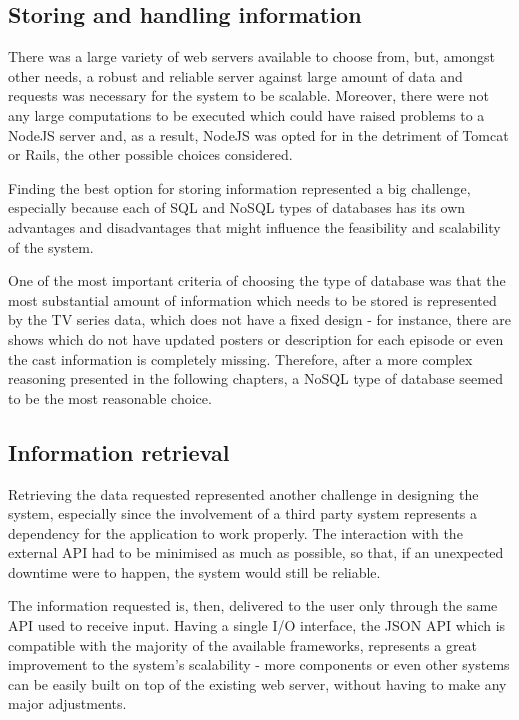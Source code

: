 \subsection{Storing and handling information}

There was a large variety of web servers available to choose from, but, amongst other needs, a robust and reliable server against large amount of data and requests was necessary for the system to be scalable. Moreover, there were not any large computations to be executed which could have raised problems to a NodeJS server and, as a result, NodeJS was opted for in the detriment of Tomcat or Rails, the other possible choices considered.

Finding the best option for storing information represented a big challenge, especially because each of SQL and NoSQL types of databases has its own advantages and disadvantages that might influence the feasibility and scalability of the system.

One of the most important criteria of choosing the type of database was that the most substantial amount of information which needs to be stored is represented by the TV series data, which does not have a fixed design - for instance, there are shows which do not have updated posters or description for each episode or even the cast information is completely missing. Therefore, after a more complex reasoning presented in the following chapters, a NoSQL type of database seemed to be the most reasonable choice.

\subsection{Information retrieval}

Retrieving the data requested represented another challenge in designing the system, especially since the involvement of a third party system represents a dependency for the application to work properly. The interaction with the external API had to be minimised as much as possible, so that, if an unexpected downtime were to happen, the system would still be reliable.

The information requested is, then, delivered to the user only through the same API used to receive input. Having a single I/O interface, the JSON API which is compatible with the majority of the available frameworks, represents a great improvement to the system's scalability - more components or even other systems can be easily built on top of the existing web server, without having to make any major adjustments.

